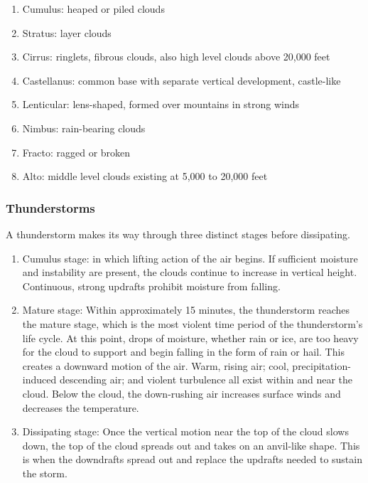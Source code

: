 \documentclass[12pt]{article}
\begin{document}
			\begin{enumerate}
				\item Cumulus: heaped or piled clouds
				\item Stratus: layer clouds
				\item Cirrus: ringlets, fibrous clouds, also high level clouds above 20,000 feet
				\item Castellanus: common base with separate vertical development, castle-like
				\item Lenticular: lens-shaped, formed over mountains in strong winds
				\item Nimbus: rain-bearing clouds
				\item Fracto: ragged or broken
				\item Alto: middle level clouds existing at 5,000 to 20,000 feet
			\end{enumerate}
		\subsubsection{Thunderstorms}
			A thunderstorm makes its way through three distinct stages before dissipating. 
			\begin{enumerate}
				\item Cumulus stage: in which lifting action of the air begins. If sufficient moisture and instability are present, the clouds continue to increase in vertical height. Continuous, strong updrafts prohibit moisture from falling.
				\item Mature stage: Within approximately 15 minutes, the thunderstorm reaches the mature stage, which is the most violent time period of the thunderstorm’s life cycle. At this point, drops of moisture, whether rain or ice, are too heavy for the cloud to support and begin falling in the form of rain or hail. This creates a downward motion of the air. Warm, rising air; cool, precipitation-induced descending air; and violent turbulence all exist within and near the cloud. Below the cloud, the down-rushing air increases surface winds and decreases the temperature. 
				\item Dissipating stage: Once the vertical motion near the top of the cloud slows down, the top of the cloud spreads out and takes on an anvil-like shape. This is when the downdrafts spread out and replace the updrafts needed to sustain the storm. 
			\end{enumerate}	
\end{document}
